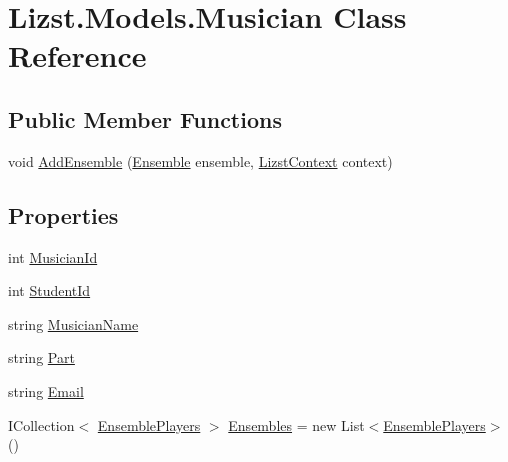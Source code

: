 \hypertarget{class_lizst_1_1_models_1_1_musician}{}\section{Lizst.\+Models.\+Musician Class Reference}
\label{class_lizst_1_1_models_1_1_musician}
\subsection*{Public Member Functions}
\begin{DoxyCompactItemize}
\item 
void \mbox{\hyperlink{class_lizst_1_1_models_1_1_musician_a0fe67fd3c3d28bd654fff32c7b6b69f5}{Add\+Ensemble}} (\mbox{\hyperlink{class_lizst_1_1_models_1_1_ensemble}{Ensemble}} ensemble, \mbox{\hyperlink{class_lizst_1_1_models_1_1_lizst_context}{Lizst\+Context}} context)
\end{DoxyCompactItemize}
\subsection*{Properties}
\begin{DoxyCompactItemize}
\item 
int \mbox{\hyperlink{class_lizst_1_1_models_1_1_musician_a7885e532a6f6792f1f6e68e914c26aa2}{Musician\+Id}}
\item 
int \mbox{\hyperlink{class_lizst_1_1_models_1_1_musician_a55f1f0dd2b4c0437813f87e1af8a6f4c}{Student\+Id}}
\item 
string \mbox{\hyperlink{class_lizst_1_1_models_1_1_musician_a66fcd0a5fd5a4b3e8df12dba62b7cc27}{Musician\+Name}}
\item 
string \mbox{\hyperlink{class_lizst_1_1_models_1_1_musician_a07f5924927b662fd45433b51a81c405f}{Part}}
\item 
string \mbox{\hyperlink{class_lizst_1_1_models_1_1_musician_a84a1ad47256cfd85feb8ed3b925055b8}{Email}}
\item 
I\+Collection$<$ \mbox{\hyperlink{class_lizst_1_1_models_1_1_ensemble_players}{Ensemble\+Players}} $>$ \mbox{\hyperlink{class_lizst_1_1_models_1_1_musician_a2efab9dbef30d0c56cf921fc7795ef2f}{Ensembles}} = new List$<$\mbox{\hyperlink{class_lizst_1_1_models_1_1_ensemble_players}{Ensemble\+Players}}$>$()
\end{DoxyCompactItemize}


